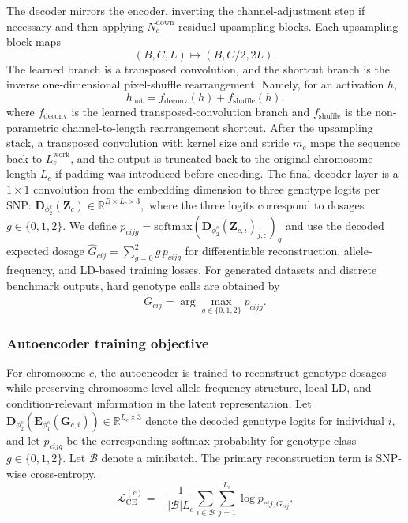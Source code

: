 \documentclass{article}
\begin{document}
The decoder mirrors the encoder, inverting the channel-adjustment step if necessary and then applying \(N_c^{\mathrm{down}}\) residual upsampling blocks. Each upsampling block maps
\[
(B,C,L) \mapsto (B,C/2,2L).
\]
The learned branch is a transposed convolution, and the shortcut branch is the inverse one-dimensional pixel-shuffle rearrangement. Namely, for an activation \(h\),
\[
h_{\mathrm{out}}
=
f_{\mathrm{deconv}}(h)
+
f_{\mathrm{shuffle}}(h).
\]
where \(f_{\mathrm{deconv}}\) is the learned transposed-convolution branch and \(f_{\mathrm{shuffle}}\) is the non-parametric channel-to-length rearrangement shortcut. After the upsampling stack, a transposed convolution with kernel size and stride \(m_c\) maps the sequence back to \(L_c^{\mathrm{work}}\), and the output is truncated back to the original chromosome length \(L_c\) if padding was introduced before encoding. The final decoder layer is a \(1\times 1\) convolution from the embedding dimension to three genotype logits per SNP:
\(
\mathbf D_{\phi_2^c}(\boldsymbol Z_c)\in\mathbb R^{B\times L_c\times 3},
\)
where the three logits correspond to dosages \(g\in\{0,1,2\}\). We define
\(
p_{cijg}
=
\mathrm{softmax}\!\left(\mathbf D_{\phi_2^c}(\boldsymbol Z_{c,i})_{j,:}\right)_g
\)
and use the decoded expected dosage
\(
\widehat G_{cij}
=
\sum_{g=0}^{2} g\,p_{cijg}
\)
for differentiable reconstruction, allele-frequency, and LD-based training losses. For generated datasets and discrete benchmark outputs, hard genotype calls are obtained by
\[
\widetilde G_{cij}
=
\arg\max_{g\in\{0,1,2\}} p_{cijg}.
\]


\subsubsection{Autoencoder training objective}
\label{sec:app-AEobjective}

For chromosome \(c\), the autoencoder is trained to reconstruct genotype dosages while preserving chromosome-level allele-frequency structure, local LD, and condition-relevant information in the latent representation. Let
\(
\mathbf D_{\phi_2^c}(\mathbf E_{\phi_1^c}(\boldsymbol G_{c,i}))
\in \mathbb R^{L_c\times 3}
\)
denote the decoded genotype logits for individual \(i\), and let \(p_{cijg}\) be the corresponding softmax probability for genotype class \(g\in\{0,1,2\}\). Let \(\mathcal B\) denote a minibatch. The primary reconstruction term is SNP-wise cross-entropy,
\[
\mathcal L_{\mathrm{CE}}^{(c)}
=
-\frac{1}{|\mathcal B|L_c}
\sum_{i\in\mathcal B}
\sum_{j=1}^{L_c}
\log p_{cij,G_{cij}} .
\]
\end{document}
